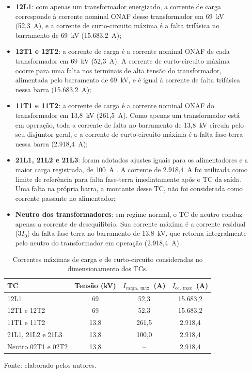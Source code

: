\begin{itemize}
    \item[--] \textbf{12L1}: com apenas um transformador energizado, a corrente de carga corresponde à corrente nominal ONAF desse transformador em 69~kV (52,3~A), e a corrente de curto-circuito máxima é a falta trifásica no barramento de 69~kV (15.683,2~A);
    \item[--] \textbf{12T1 e 12T2}: a corrente de carga é a corrente nominal ONAF de cada transformador em 69~kV (52,3~A). A corrente de curto-circuito máxima ocorre para uma falta nos terminais de alta tensão do transformador, alimentada pelo barramento de 69~kV, e é igual à corrente de falta trifásica nessa barra (15.683,2~A);
    \item[--] \textbf{11T1 e 11T2}: a corrente de carga é a corrente nominal ONAF do transformador em 13,8~kV (261,5~A). Como apenas um transformador está em operação, toda a corrente de falta no barramento de 13,8~kV circula pelo seu disjuntor geral, e a corrente de curto-circuito máxima é a falta fase-terra nessa barra (2.918,4~A);
    \item[--] \textbf{21L1, 21L2 e 21L3}: foram adotados ajustes iguais para os alimentadores e a maior carga registrada, de 100~A \cite{sampaio2026roteiro}. A corrente de 2.918,4~A foi utilizada como limite de referência para falta fase-terra imediatamente após o TC da saída. Uma falta na própria barra, a montante desse TC, não foi considerada como corrente passante no alimentador;
    \item[--] \textbf{Neutro dos transformadores}: em regime normal, o TC de neutro conduz apenas a corrente de desequilíbrio. Sua corrente máxima é a corrente residual ($3I_0$) da falta fase-terra no barramento de 13,8~kV, que retorna integralmente pelo neutro do transformador em operação (2.918,4~A).
\end{itemize}

\begin{table}[htbp]
    \centering
    \caption{Correntes máximas de carga e de curto-circuito consideradas no dimensionamento dos TCs.}
    \label{tab:correntes_tc}
    \begin{tabular}{lccc}
        \hline
        \textbf{TC} & \textbf{Tensão (kV)} & \textbf{$I_{\mathrm{carga},\max}$ (A)} & \textbf{$I_{\mathrm{cc},\max}$ (A)} \\
        \hline
        12L1                 & 69   & 52,3  & 15.683,2 \\
        12T1 e 12T2          & 69   & 52,3  & 15.683,2 \\
        11T1 e 11T2          & 13,8 & 261,5 & 2.918,4 \\
        21L1, 21L2 e 21L3    & 13,8 & 100,0 & 2.918,4 \\
        Neutro 02T1 e 02T2   & 13,8 & --    & 2.918,4 \\
        \hline
    \end{tabular}
    \par\vspace{2pt}
    {\small Fonte: elaborado pelos autores.}
\end{table}


